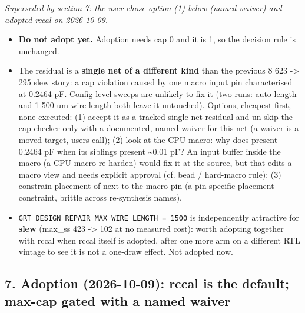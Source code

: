 \begin{record}

\emph{Superseded by section 7: the user chose option (1) below (named
waiver) and adopted rccal on 2026-10-09.}

\begin{itemize}
\tightlist
\item
  \textbf{Do not adopt yet.} Adoption needs cap 0 and it is 1, so the
  decision rule is unchanged.
\item
  The residual is a \textbf{single net of a different kind} than the
  previous 8 623 -\textgreater{} 295 slew story: a cap violation caused
  by one macro input pin characterised at 0.2464 pF. Config-level sweeps
  are unlikely to fix it (two runs: auto-length and 1 500 um wire-length
  both leave it untouched). Options, cheapest first, none executed: (1)
  accept it as a tracked single-net residual and un-skip the cap checker
  only with a documented, named waiver for this net (a waiver is a moved
  target, user\textquotesingle s call); (2) look at the CPU macro: why
  does  present 0.2464 pF when its siblings
  present \textasciitilde0.01 pF? An input buffer inside the macro (a
  CPU macro re-harden) would fix it at the source, but that edits a
  macro view and needs explicit approval (cf. bead /
  hard-macro rule); (3) constrain placement of  next to
  the macro pin (a pin-specific placement constraint, brittle across
  re-synthesis names).
\item
  \texttt{GRT\_\allowbreak{}DESIGN\_\allowbreak{}REPAIR\_\allowbreak{}MAX\_\allowbreak{}WIRE\_\allowbreak{}LENGTH\ =\allowbreak{}\ 1500}
  is independently attractive for \textbf{slew} (max\_ss 423
  -\textgreater{} 102 at no measured cost): worth adopting together with
  rccal when rccal itself is adopted, after one more arm on a different
  RTL vintage to see it is not a one-draw effect. Not adopted now.
\end{itemize}

\end{record}

\subsection{7. Adoption (2026-10-09): rccal is the default; max-cap
gated with a named waiver}\label{cr:defect:sky130-slew-cap-e45j:7-adoption-2026-10-09-rccal-is-the-default-max-cap-gated-with-a-named-waiver}


